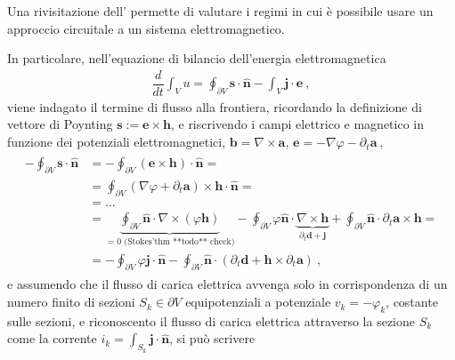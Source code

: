 \documentclass[letterpaper,10pt,english]{jupyterBook}
\begin{document}
\sphinxAtStartPar
Una rivisitazione dell’{\hyperref[\detokenize{ch/energy:classical-electromagnetism-energy}]{}} permette di valutare i regimi in cui è possibile usare un approccio circuitale a un sistema elettromagnetico.

\sphinxAtStartPar
In particolare, nell’equazione di bilancio dell’energia elettromagnetica
\begin{equation*}
\begin{split}\dfrac{d}{dt} \int_V u = \oint_{\partial V} \mathbf{s} \cdot \hat{\mathbf{n}} - \int_V \mathbf{j} \cdot \mathbf{e} \ ,\end{split}
\end{equation*}
\sphinxAtStartPar
viene indagato il termine di flusso alla frontiera, ricordando la definizione di vettore di Poynting \(\mathbf{s} := \mathbf{e} \times \mathbf{h}\), e riscrivendo i campi elettrico e magnetico in funzione dei potenziali elettromagnetici, \(\mathbf{b} = \nabla \times \mathbf{a}\), \(\mathbf{e} = - \nabla \varphi - \partial_t \mathbf{a} \ ,\)
\begin{equation*}
\begin{split}\begin{aligned}
  - \oint_{\partial V} \mathbf{s} \cdot \mathbf{\hat{n}}
  & = - \oint_{\partial V} \left(\mathbf{e} \times \mathbf{h} \right) \cdot \mathbf{\hat{n}} = \\
  & =   \oint_{\partial V} \left(\nabla \varphi + \partial_t \mathbf{a} \right) \times \mathbf{h}  \cdot \mathbf{\hat{n}} = \\
  & = ... \\
  & = \underbrace{\oint_{\partial V} \hat{\mathbf{n}} \cdot \nabla \times ( \varphi \mathbf{h} )}_{=0 \text{ (Stokes'thm **todo** check)}} - \oint_{\partial V} \varphi \hat{\mathbf{n}} \cdot \underbrace{\nabla \times \mathbf{h}}_{\partial_t \mathbf{d} + \mathbf{j}} + \oint_{\partial V} \hat{\mathbf{n}} \cdot \partial_t \mathbf{a} \times \mathbf{h} = \\
  & = - \oint_{\partial V} \varphi \mathbf{j} \cdot \hat{\mathbf{n}} - \oint_{\partial V} \hat{\mathbf{n}} \cdot \left( \partial_t \mathbf{d} + \mathbf{h} \times \partial_t \mathbf{a} \right) \ , 
\end{aligned}\end{split}
\end{equation*}
\sphinxAtStartPar
e assumendo che il flusso di carica elettrica avvenga solo in corrispondenza di un numero finito di sezioni \(S_k \in \partial V\) equipotenziali a potenziale \(v_k = -\varphi_k\), costante sulle sezioni, e riconoscento il flusso di carica elettrica attraverso la sezione \(S_k\) come la corrente \(i_k = \int_{S_k} \mathbf{j} \cdot \hat{\mathbf{n}}\), si può scrivere
\end{document}
